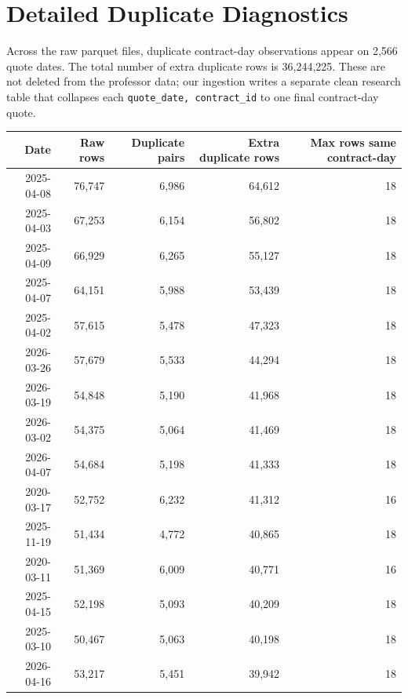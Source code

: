 \documentclass[11pt]{article}
\begin{document}
\section*{Detailed Duplicate Diagnostics}

Across the raw parquet files, duplicate contract-day observations appear on
2,566 quote dates. The
total number of extra duplicate rows is 36,244,225.
These are not deleted from the professor data; our ingestion writes a separate
clean research table that collapses each \texttt{quote\_date, contract\_id}
to one final contract-day quote.

\begingroup
\scriptsize
\begin{longtable}{rrrrr}
\toprule
Date & Raw rows & Duplicate pairs & Extra duplicate rows & Max rows same contract-day \\
\midrule
2025-04-08 & 76,747 & 6,986 & 64,612 & 18 \\
2025-04-03 & 67,253 & 6,154 & 56,802 & 18 \\
2025-04-09 & 66,929 & 6,265 & 55,127 & 18 \\
2025-04-07 & 64,151 & 5,988 & 53,439 & 18 \\
2025-04-02 & 57,615 & 5,478 & 47,323 & 18 \\
2026-03-26 & 57,679 & 5,533 & 44,294 & 18 \\
2026-03-19 & 54,848 & 5,190 & 41,968 & 18 \\
2026-03-02 & 54,375 & 5,064 & 41,469 & 18 \\
2026-04-07 & 54,684 & 5,198 & 41,333 & 18 \\
2020-03-17 & 52,752 & 6,232 & 41,312 & 16 \\
2025-11-19 & 51,434 & 4,772 & 40,865 & 18 \\
2020-03-11 & 51,369 & 6,009 & 40,771 & 16 \\
2025-04-15 & 52,198 & 5,093 & 40,209 & 18 \\
2025-03-10 & 50,467 & 5,063 & 40,198 & 18 \\
2026-04-16 & 53,217 & 5,451 & 39,942 & 18 \\
\bottomrule
\end{longtable}
\endgroup
\end{document}
